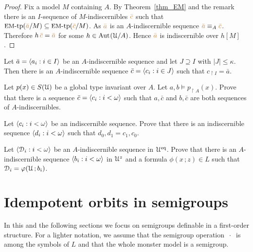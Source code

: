 \begin{proof}
Fix a model $M$ containing $A$.
By Theorem~\ref{thm_EM} and the remark there is an $I$-sequence of $M$-indiscernibles ${\color{brown}\bar c}$ such that $\mbox{{\small EM}-tp}({\color{brown}\bar a}/M)\subseteq\mbox{{\small EM}-tp}({\color{brown}\bar c}/M)$.
As ${\color{brown}\bar a}$ is an $A$-indiscernible sequence ${\color{brown}\bar a}\equiv_A{\color{brown}\bar c}$.
Therefore $h\,{\color{brown}\bar c}={\color{brown}\bar a}$ for some $h\in{\rm Aut\kern.15ex}(\EuScript U/A)$.
Hence ${\color{brown}\bar a}$ is indiscernible over $h[M]$.
\end{proof}

\begin{exercise}
  Let $\bar a=\langle a_i:i\in I\rangle$ be an $A$-indiscernible sequence and let $J\supseteq I$ with $|J|\le \kappa$.
  Then there is an $A$-indiscernible sequence $\bar c=\langle c_i:i\in J\rangle$ such that $c_{\restriction I}=\bar a$.
\end{exercise}

\begin{exercise}
  Let  $p(x)\in S(\EuScript U)$ be a global type invariant over $A$.
  Let $a,b\models p_{\restriction A}(x)$.
  Prove that there is a sequence $\bar c=\langle c_i:i<\omega\rangle$ such that $a,\bar c$ and $b,\bar c$ are both sequences of $A$-indiscernibles.
\end{exercise}

\begin{exercise}\label{ex_symmetry_ind}
  Let $\langle c_i:i<\omega\rangle$ be an indiscernible sequence.
  Prove that there is an indiscernible sequence $\langle d_i:i<\omega\rangle$ such that $d_0,d_1 = c_1,c_0$.
\end{exercise}

\begin{exercise}
  Let $\langle\EuScript D_i:i<\omega\rangle$ be an $A$-indiscernible sequence in $\EuScript U^{{\rm eq}}$.
  Prove that there is an $A$-indiscernible sequence $\langle b_i:i<\omega\rangle$ in $\EuScript U^z$ and a formula $\phi(x\,;z)\in L$ such that $\EuScript D_i=\varphi(\EuScript U\,;b_i)$.
\end{exercise}

\section{Idempotent orbits in semigroups}\label{semigroups}

\def\medrel#1{\parbox[t]{6ex}{$\displaystyle\hfil #1$}}
\def\ceq#1#2#3{\parbox[t]{22ex}{$\displaystyle #1$}\medrel{#2}{$\displaystyle #3$}}

In this and the following sections we focus on semigroups definable in a first-order structure.
For a lighter notation, we assume that the semigroup operation \emph{$\ \cdot\ $} is among the symbols of $L$ and that the whole monster model is a semigroup.

